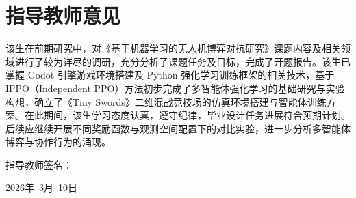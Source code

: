 \documentclass[12pt,a4paper,UTF8]{ctexart}
\numberwithin{equation}{section}
\begin{document}
\section{指导教师意见}

该生在前期研究中，对《基于机器学习的无人机博弈对抗研究》课题内容及相关领域进行了较为详尽的调研，充分分析了课题任务及目标，完成了开题报告。该生已掌握 Godot 引擎游戏环境搭建及 Python 强化学习训练框架的相关技术，基于 IPPO（Independent PPO）方法初步完成了多智能体强化学习的基础研究与实验构想，确立了《Tiny Swords》二维混战竞技场的仿真环境搭建与智能体训练方案。在此期间，该生学习态度认真，遵守纪律，毕业设计任务进展符合预期计划。后续应继续开展不同奖励函数与观测空间配置下的对比实验，进一步分析多智能体博弈与协作行为的涌现。

\vspace{3em}

\begin{flushright}
    指导教师签名：\hspace{5em}

    \vspace{2em}

    2026年~3月~10日
\end{flushright}
\end{document}
